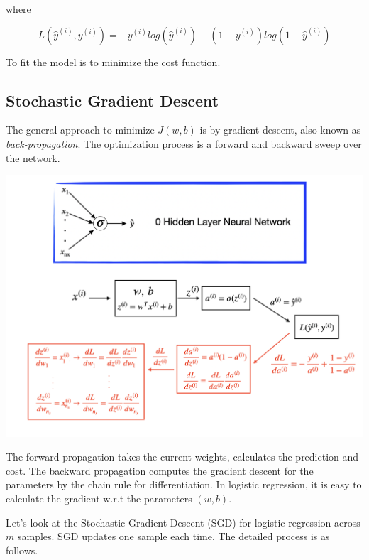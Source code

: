 \documentclass[
  12pt,
]{krantz}
\begin{document}
where

\[L(\hat{y}^{(i)}, y^{(i)}) =  -y^{(i)}log(\hat{y}^{(i)})-(1-y^{(i)})log(1-\hat{y}^{(i)})\]

To fit the model is to minimize the cost function.

\hypertarget{stochastic-gradient-descent}{%
\subsection{Stochastic Gradient Descent}\label{stochastic-gradient-descent}}

The general approach to minimize \(J(w,b)\) is by gradient descent, also known as \emph{back-propagation}. The optimization process is a forward and backward sweep over the network.

\includegraphics[width=1\textwidth,height=\textheight]{images/dnn0_fb3.png}

The forward propagation takes the current weights, calculates the prediction and cost. The backward propagation computes the gradient descent for the parameters by the chain rule for differentiation. In logistic regression, it is easy to calculate the gradient w.r.t the parameters \((w, b)\).

Let's look at the Stochastic Gradient Descent (SGD) for logistic regression across \(m\) samples. SGD updates one sample each time. The detailed process is as follows.
\end{document}
